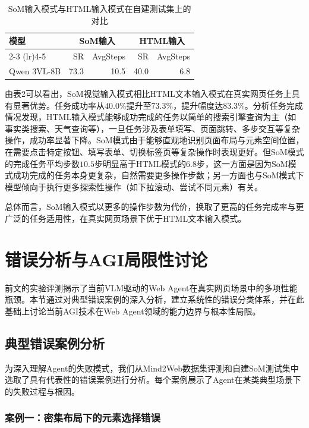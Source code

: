 \documentclass{SYSUReport}
\begin{document}
\begin{table}[H]
\centering
\small
\caption{SoM输入模式与HTML输入模式在自建测试集上的对比}
\label{tab:som_vs_html}
\setlength{\tabcolsep}{6pt}
\begin{tabular}{l|rr|rr}
\toprule
\multirow{2}{*}{模型} & \multicolumn{2}{c|}{SoM输入} & \multicolumn{2}{c}{HTML输入} \\
\cmidrule(lr){2-3} \cmidrule(lr){4-5}
& SR & AvgSteps & SR & AvgSteps \\
\midrule
Qwen 3VL-8B & 73.3 & 10.5 & 40.0 & 6.8 \\
\bottomrule
\end{tabular}
\end{table}

由表2可以看出，SoM视觉输入模式相比HTML文本输入模式在真实网页任务上具有显著优势。任务成功率从$40.0\%$提升至$73.3\%$，提升幅度达$83.3\%$。分析任务完成情况发现，HTML输入模式能够成功完成的任务以简单的搜索引擎查询为主（如事实类搜索、天气查询等），一旦任务涉及表单填写、页面跳转、多步交互等复杂操作，成功率显著下降。SoM模式由于能够直观地识别页面布局与元素空间位置，在需要点击特定按钮、填写表单、切换标签页等复杂操作时表现更好。但SoM模式的完成任务平均步数$10.5$步明显高于HTML模式的$6.8$步，这一方面是因为SoM模式成功完成的任务本身更复杂，自然需要更多操作步数；另一方面也与SoM模式下模型倾向于执行更多探索性操作（如下拉滚动、尝试不同元素）有关。

总体而言，SoM输入模式以更多的操作步数为代价，换取了更高的任务完成率与更广泛的任务适用性，在真实网页场景下优于HTML文本输入模式。


\section{错误分析与AGI局限性讨论}

前文的实验评测揭示了当前VLM驱动的Web Agent在真实网页场景中的多项性能瓶颈。本节通过对典型错误案例的深入分析，建立系统性的错误分类体系，并在此基础上讨论当前AGI技术在Web Agent领域的能力边界与根本性局限。

\subsection{典型错误案例分析}

为深入理解Agent的失败模式，我们从Mind2Web数据集评测和自建SoM测试集中选取了具有代表性的错误案例进行分析。每个案例展示了Agent在某类典型场景下的失败过程与根因。

\subsubsection{案例一：密集布局下的元素选择错误}
\end{document}
